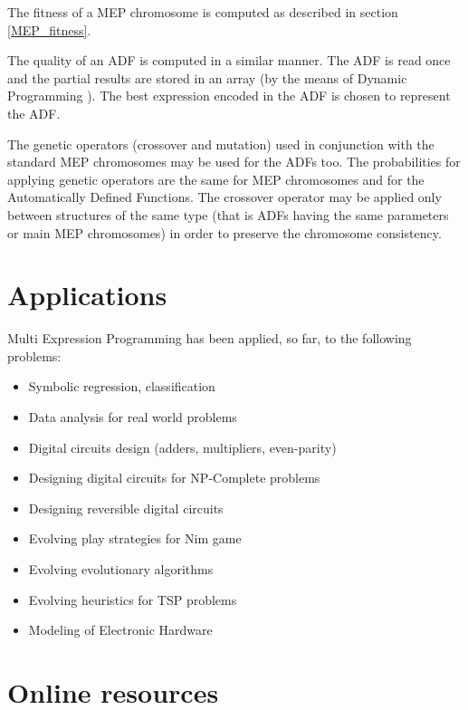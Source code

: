 \documentclass [11pt]{article}
\begin{document}
The fitness of a MEP chromosome is computed as described in section \ref{MEP_fitness}.

The quality of an ADF is computed in a similar manner. The ADF is read once 
and the partial results are stored in an array (by the means of Dynamic 
Programming \cite{bellman1}). The best expression encoded in the ADF is chosen to 
represent the ADF. 

The genetic operators (crossover and mutation) used in conjunction with the 
standard MEP chromosomes may be used for the ADFs too. The probabilities for 
applying genetic operators are the same for MEP chromosomes and for the 
Automatically Defined Functions. The crossover operator may be applied only 
between structures of the same type (that is ADFs having the same parameters or main MEP chromosomes) in order to preserve the chromosome consistency.

\section{Applications}

Multi Expression Programming has been applied, so far, to the following problems:

\begin{itemize}

\item{Symbolic regression, classification \cite{oltean_complex}}
\item{Data analysis for real world problems \cite{oltean_complex}}
\item{Digital circuits design (adders, multipliers, even-parity) \cite{oltean_parity_fea,oltean_circuits_nasa,oltean_parity_trail}}
\item{Designing digital circuits for NP-Complete problems \cite{oltean_knapsack}}
\item{Designing reversible digital circuits \cite{oltean_reversible}}
\item{Evolving play strategies for Nim game \cite{oltean_nim}}
\item{Evolving evolutionary algorithms \cite{oltean_mep_eea,oltean_evolving_patterns}}
\item{Evolving heuristics for TSP problems \cite{oltean_tsp}}
\item{Modeling of Electronic Hardware \cite{ajith5}}

\end{itemize}

\section{Online resources}
\end{document}

